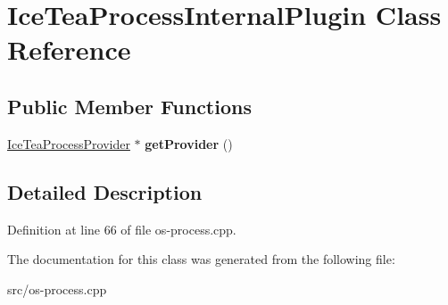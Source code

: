 \hypertarget{class_ice_tea_process_internal_plugin}{}\section{Ice\+Tea\+Process\+Internal\+Plugin Class Reference}
\label{class_ice_tea_process_internal_plugin}
\subsection*{Public Member Functions}
\begin{DoxyCompactItemize}
\item 
\hyperlink{class_ice_tea_process_provider}{Ice\+Tea\+Process\+Provider} $\ast$ {\bfseries get\+Provider} ()\hypertarget{class_ice_tea_process_internal_plugin_aa9672900147b6d8e011c14ffc658b10f}{}\label{class_ice_tea_process_internal_plugin_aa9672900147b6d8e011c14ffc658b10f}

\end{DoxyCompactItemize}


\subsection{Detailed Description}


Definition at line 66 of file os-\/process.\+cpp.



The documentation for this class was generated from the following file\+:\begin{DoxyCompactItemize}
\item 
src/os-\/process.\+cpp\end{DoxyCompactItemize}
